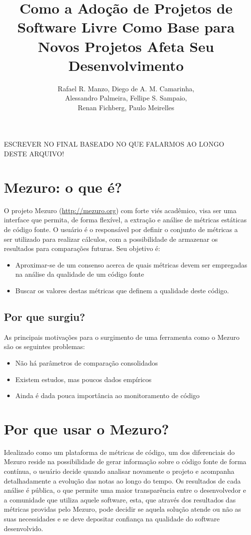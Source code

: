 \documentclass[12pt]{article}
\title{Como a Adoção de Projetos de Software Livre Como Base para Novos Projetos Afeta Seu Desenvolvimento}
\author{Rafael R. Manzo\inst{1}, Diego de A. M. Camarinha\inst{1},\\
        Alessandro Palmeira\inst{1}, Fellipe S. Sampaio\inst{1},\\
        Renan Fichberg\inst{1}, Paulo Meirelles\inst{2}}
\begin{document}
\maketitle

\begin{resumo}
  ESCREVER NO FINAL BASEADO NO QUE FALARMOS AO LONGO DESTE ARQUIVO!
\end{resumo}

\section{Mezuro: o que é?} \label{sec:projeto-mezuro}
O projeto Mezuro (\url{http://mezuro.org}) com forte viés acadêmico, visa ser uma interface que permita, de forma flexível, a extração e análise de métricas estáticas de código fonte. O usuário é o responsável por definir o conjunto de métricas a ser utilizado para realizar cálculos, com a possibilidade de armazenar os resultados para comparações futuras. Seu objetivo é: 
\begin{itemize}
    \item Aproximar-se de um consenso acerca de quais métricas devem ser empregadas na análise da qualidade de um código fonte
    \item Buscar os valores destas métricas que definem a qualidade deste código.
\end{itemize}

\subsection{Por que surgiu?} \label{subsec:problemas}
As principais motivações para o surgimento de uma ferramenta como o Mezuro são os seguintes problemas:
\begin{itemize}
    \item Não há parâmetros de comparação consolidados
    \item Existem estudos, mas poucos dados empíricos
    \item Ainda é dada pouca importância ao monitoramento de código
\end{itemize}

\section{Por que usar o Mezuro?} \label{sec:projeto-mezuro}
Idealizado como um plataforma de métricas de código, um dos diferenciais do Mezuro reside na possibilidade de gerar informação sobre o código fonte de forma contínua, o usuário decide quando analisar novamente o projeto e acompanha detalhadamente a evolução  das notas ao longo do tempo. Os resultados de cada análise é pública, o que permite uma maior transparência entre o desenvolvedor e a comunidade que utiliza aquele software, esta, que através dos resultados das métricas providas pelo Mezuro, pode decidir se aquela solução atende ou não as suas necessidades e se deve depositar confiança na qualidade do software desenvolvido.
\end{document}
